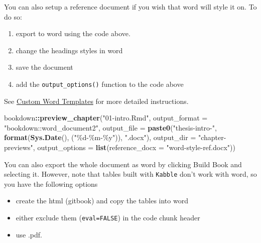\documentclass[
  12pt,
  oneside]{book}
\newenvironment{Shaded}{\begin{snugshade}}{\end{snugshade}}
\newcommand{\AttributeTok}[1]{\textcolor[rgb]{0.13,0.29,0.53}{#1}}
\newcommand{\FunctionTok}[1]{\textcolor[rgb]{0.13,0.29,0.53}{\textbf{#1}}}
\newcommand{\NormalTok}[1]{#1}
\newcommand{\SpecialCharTok}[1]{\textcolor[rgb]{0.81,0.36,0.00}{\textbf{#1}}}
\newcommand{\StringTok}[1]{\textcolor[rgb]{0.31,0.60,0.02}{#1}}
\providecommand{\tightlist}{%
  \setlength{\itemsep}{0pt}\setlength{\parskip}{0pt}}
\begin{document}
You can also setup a reference document if you wish that word will style it on. To do so:

\begin{enumerate}
\def\labelenumi{\arabic{enumi}.}
\tightlist
\item
  export to word using the code above.
\item
  change the headings styles in word
\item
  save the document
\item
  add the \texttt{output\_options()} function to the code above
\end{enumerate}

See \href{https://bookdown.org/yihui/rmarkdown-cookbook/word-template.html}{Custom Word Templates} for more detailed instructions.

\begin{Shaded}
\begin{Highlighting}[]
\NormalTok{bookdown}\SpecialCharTok{::}\FunctionTok{preview\_chapter}\NormalTok{(}\StringTok{"01{-}intro.Rmd"}\NormalTok{,}
                \AttributeTok{output\_format =} \StringTok{"bookdown::word\_document2"}\NormalTok{,}
                \AttributeTok{output\_file =} \FunctionTok{paste0}\NormalTok{(}\StringTok{"thesis{-}intro{-}"}\NormalTok{, }
                                     \FunctionTok{format}\NormalTok{(}\FunctionTok{Sys.Date}\NormalTok{(), }
\NormalTok{                                            (}\StringTok{"\%d{-}\%m{-}\%y"}\NormalTok{)), }
                                     \StringTok{".docx"}\NormalTok{),}
                \AttributeTok{output\_dir =} \StringTok{"chapter{-}previews"}\NormalTok{,}
                \AttributeTok{output\_options =} \FunctionTok{list}\NormalTok{(}\AttributeTok{reference\_docx =} \StringTok{"word{-}style{-}ref.docx"}\NormalTok{))}
\end{Highlighting}
\end{Shaded}

You can also export the whole document as word by clicking Build Book and selecting it. However, note that tables built with \texttt{Kabble} don't work with word, so you have the following options

\begin{itemize}
\tightlist
\item
  create the html (gitbook) and copy the tables into word
\item
  either exclude them (\texttt{eval=FALSE}) in the code chunk header
\item
  use .pdf.
\end{itemize}
\end{document}
